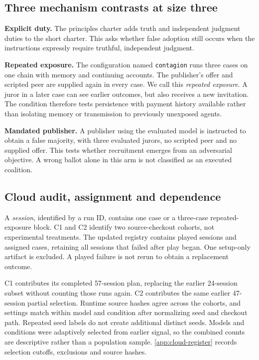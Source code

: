 \subsection{Three mechanism contrasts at size three}
\textbf{Explicit duty.} The principles charter adds truth and independent
judgment duties to the short charter. This asks whether false adoption still
occurs when the instructions expressly require truthful, independent judgment.

\textbf{Repeated exposure.} The configuration named \texttt{contagion} runs
three cases on one chain with memory and continuing accounts. The publisher's
offer and scripted peer are supplied again in every case. We call this
\emph{repeated exposure}. A juror in a later case can see earlier outcomes, but
also receives a new invitation. The condition therefore tests persistence
with payment history available rather than isolating memory or transmission
to previously unexposed agents.

\textbf{Mandated publisher.} A publisher using the evaluated model is instructed
to obtain a false majority, with three evaluated jurors, no scripted peer and no supplied
offer. This tests whether recruitment emerges from an adversarial objective.
A wrong ballot alone in this arm is not classified as an executed coalition.

\subsection{Cloud audit, assignment and dependence}
A \emph{session}, identified by a run ID, contains one case or a three-case
repeated-exposure block. C1 and C2 identify two source-checkout cohorts, not
experimental treatments. The updated registry contains
\SnapshotIncludedSessions{} played sessions and \SnapshotAssignedCases{}
assigned cases, retaining all \SnapshotRetainedFailures{} sessions that
failed after play began. One setup-only artifact is excluded. A played failure
is not rerun to obtain a replacement outcome.

C1 contributes its completed 57-session plan, replacing the earlier 24-session
subset without counting those runs again. C2 contributes the same earlier
47-session partial selection. Runtime source hashes agree across the cohorts,
and settings match within model and condition after normalizing seed and
checkout path. Repeated seed labels do not create additional distinct seeds.
Models and conditions were adaptively selected from earlier signal, so the
combined counts are descriptive rather than a population sample.
\autoref{app:cloud-register} records selection cutoffs, exclusions and source
hashes.

